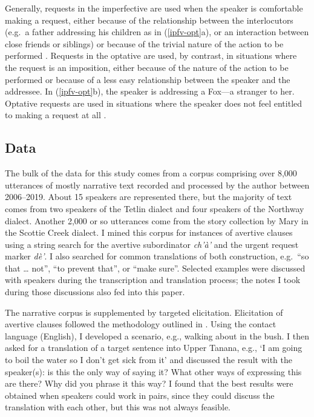 \documentclass[output=paper,colorlinks,citecolor=brown]{langscibook}
\begin{document}
Generally, requests in the imperfective are used when the speaker is comfortable making a request, either because of the relationship between the interlocutors (e.g.\  a father addressing his children as in (\ref{ipfv-opt}a), or an interaction between close friends or siblings) or because of the trivial nature of the action to be performed \citep[280--283]{LovickO2016}. Requests in the optative are used, by contrast, in situations where the request is an imposition, either because of the nature of the action to be performed or because of a less easy relationship between the speaker and the addressee. In (\ref{ipfv-opt}b), the speaker is addressing a Fox—a stranger to her. Optative requests are used in situations where the speaker does not feel entitled to making a request at all \citep[283--285]{LovickO2016}.





\subsection{Data}
\label{subsection:data}

The bulk of the data for this study comes from a corpus comprising over 8,000 utterances of mostly narrative text recorded and processed by the author between 2006--2019. About 15 speakers are represented there, but the majority of text comes from two speakers of the Tetlin dialect and four speakers of the Northway dialect. Another 2,000 or so utterances come from the story collection by Mary \citet{TyoneM1996} in the Scottie Creek dialect. I mined this corpus for instances of avertive clauses using a string search for the avertive subordinator \textit{ch'à'} and the urgent request marker \textit{dè'}. I also searched for common translations of both construction, e.g.\  ``so that {\ldots} not'',  ``to prevent that'', or ``make sure''. Selected examples were discussed with speakers during the transcription and translation process; the notes I took during those discussions also fed into this paper.

The narrative corpus is supplemented by targeted elicitation. Elicitation of avertive clauses followed the methodology outlined in \citet{VuillermetM2018questionnaire}. Using the contact language (English), I developed a scenario, e.g., walking about in the bush. I then asked for a translation of a target sentence into Upper Tanana, e.g., `I am going to boil the water so I don't get sick from it'  and discussed the result with the speaker(s): is this the only way of saying it? What other ways of expressing this are there? Why did you phrase it this way? I found that the best results were obtained when speakers could work in pairs, since they could discuss the translation with each other, but this was not always feasible. 
\end{document}
